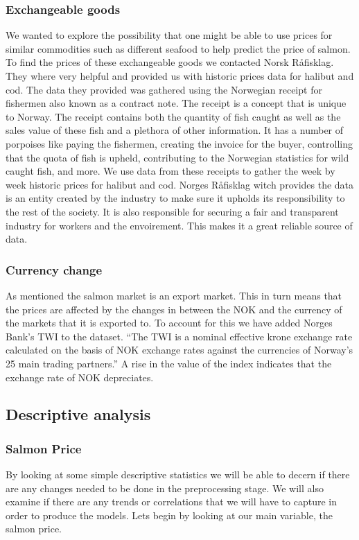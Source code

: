 \subsubsection{Exchangeable goods}\label{Exchangeable goods}
We wanted to explore the possibility that one might be able to use prices for similar commodities such as different seafood to help predict the price of salmon. To find the prices of these exchangeable goods we contacted Norsk Råfisklag. They where very helpful and provided us with historic prices data for halibut and cod. The data they provided was gathered using the Norwegian receipt for fishermen also known as a contract note. The receipt is a concept that is unique to Norway. The receipt contains both the quantity of fish caught as well as the sales value of these fish and a plethora of other information. It has a number of porpoises like paying the fishermen, creating the invoice for the buyer, controlling that the quota of fish is upheld, contributing to the Norwegian statistics for wild caught fish, and more. We use data from these receipts to gather the week by week historic prices for halibut and cod. Norges Råfisklag witch provides the data is an entity created by the industry to make sure it upholds its responsibility to the rest of the society. It is also responsible for securing a fair and transparent industry for workers and the envoirement. This makes it a great reliable source of data.\parencite{Harland_2022}

\subsubsection{Currency change}\label{Currency change}
As mentioned the salmon market is an export market. This in turn means that the prices are affected by the changes in between the NOK and the currency of the markets that it is exported to. To account for this we have added Norges Bank's TWI to the dataset. ``The TWI is a nominal effective krone exchange rate calculated on the basis of NOK exchange rates against the currencies of Norway's 25 main trading partners.'' \parencite{norges_bank_2020} A rise in the value of the index indicates that the exchange rate of NOK depreciates.

\subsection{Descriptive analysis}
\subsubsection{Salmon Price}\label{Salmon Price}
By looking at some simple descriptive statistics we will be able to decern if there are any changes needed to be done in the preprocessing stage. We will also examine if there are any trends or correlations that we will have to capture in order to produce the models. Lets begin by looking at our main variable, the salmon price.


